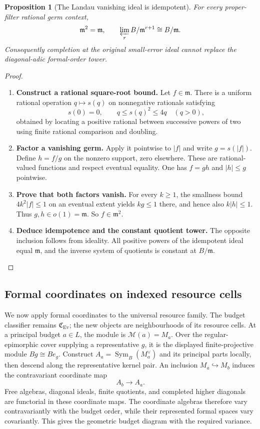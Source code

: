 \documentclass[11pt,a4paper]{article}
\numberwithin{algorithm}{section}
\numberwithin{equation}{section}
\newtheorem{proposition}[proposition]{Proposition}
\theoremstyle{definition}
\theoremstyle{remark}
\theoremstyle{plain}
\newcommand{\incl}{\hookrightarrow}
\newcommand{\Sym}{\operatorname{Sym}}
\newcommand{\Ev}{{\operatorname{Ev}}}
\newcommand{\Cplx}{\mathfrak C_{\Ev}}
\theoremstyle{definition}
\theoremstyle{plain}
\begin{document}
\begin{proposition}[The Landau vanishing ideal is idempotent]
\label{prop:vanishing-idempotent}
For every proper-filter rational germ context,
\[
 \mathfrak m^2=\mathfrak m,\qquad
 \varprojlim_r B/\mathfrak m^{r+1}\cong B/\mathfrak m.
\]
Consequently completion at the original small-error ideal cannot
replace the diagonal-adic formal-order tower.
\end{proposition}
\begin{proof}\leavevmode
\begin{enumerate}[leftmargin=*,align=left]
\item \textbf{Construct a rational square-root bound.}
Let $f\in\mathfrak m$.  There is a uniform rational operation
$q\mapsto s(q)$ on nonnegative rationals satisfying
\[
 s(0)=0,\qquad q\le s(q)^2\le4q\quad(q>0),
\]
obtained by locating a positive rational between successive
powers of two using finite rational comparison and doubling.

\item \textbf{Factor a vanishing germ.}
Apply it pointwise to $|f|$ and write $g=s(|f|)$.  Define
$h=f/g$ on the nonzero support, zero elsewhere.  These are
rational-valued functions and respect eventual equality.  One has
$f=gh$ and $|h|\le g$ pointwise.

\item \textbf{Prove that both factors vanish.}
For every $k\ge1$, the
smallness bound $4k^2|f|\le1$ on an eventual extent yields
$kg\le1$ there, and hence also $k|h|\le1$.  Thus
$g,h\in o(1)=\mathfrak m$.  So $f\in\mathfrak m^2$.

\item \textbf{Deduce idempotence and the constant quotient tower.}
The opposite inclusion follows from ideality.  All positive
powers of the idempotent ideal equal $\mathfrak m$, and the
inverse system of quotients is constant at $B/\mathfrak m$.
\end{enumerate}
\end{proof}

\subsection{Formal coordinates on indexed resource cells}
\label{sec:formal-budget-index}
We now apply formal coordinates to the universal resource family.
The budget classifier remains $\Cplx$; the new objects are
neighbourhoods of its resource cells.
At a principal budget $a\in L$, the module is $\mathscr M(a)=M_a$.
Over the regular-epimorphic cover supplying a representative $g$,
it is the displayed finite-projective module $Bg\cong Be_g$.
Construct $A_a=\Sym_B(M_a^\vee)$ and its principal parts locally,
then descend along the representative kernel pair. An inclusion
$M_a\incl M_b$ induces the contravariant coordinate map
\[
 A_b\longrightarrow A_a.
\]
Free algebras, diagonal ideals, finite quotients, and completed
higher diagonals are functorial in these coordinate maps.
The coordinate algebras therefore vary contravariantly with the
budget order, while their represented formal spaces vary covariantly.
This gives the geometric budget diagram with the required variance.
\end{document}
